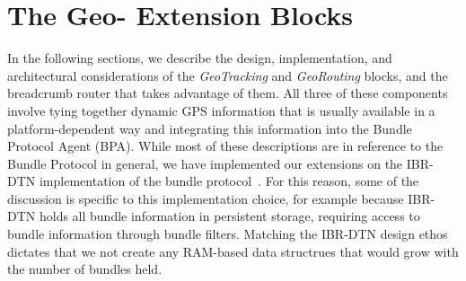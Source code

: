 \documentclass{sig-alternate}
\begin{document}
\CopyrightYear
\crdata










%
%




%
%

\section{The Geo- Extension Blocks}
In the following sections, we describe the design, implementation, and
architectural considerations of the {\em GeoTracking} and {\em
  GeoRouting} blocks, and the {\sc breadcrumb} router that takes
advantage of them. All three of these components involve tying
together dynamic GPS information that is usually available in a
platform-dependent way and integrating this information into the
Bundle Protocol Agent (BPA). While most of these descriptions are in
reference to the Bundle Protocol in general, we have implemented our
extensions on the IBR-DTN implementation of the bundle
protocol~\cite{IBR-DTN-WASA}. For this reason, some of the discussion
is specific to this implementation choice, for example because IBR-DTN
holds all bundle information in persistent storage, requiring access
to bundle information through bundle filters. Matching the IBR-DTN
design ethos dictates that we not create any RAM-based data structrues
that would grow with the number of bundles held.





\end{document}
